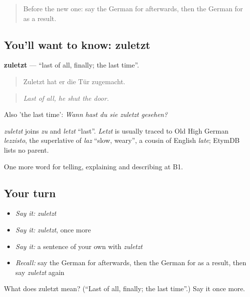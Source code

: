 \begin{quote}
Before the new one: say the German for afterwards, then the German for as a result.
\end{quote}

\subsection*{You'll want to know: zuletzt}
\textbf{zuletzt} — \textquotedblleft{}last of all, finally; the last time\textquotedblright{}.

\begin{quote}
Zuletzt hat er die Tür zugemacht.
\end{quote}

\begin{quote}
\emph{Last of all, he shut the door.}
\end{quote}

Also 'the last time': \emph{Wann hast du sie zuletzt gesehen?}

\begin{cousinweb}
\emph{zuletzt} joins \emph{zu} and \emph{letzt} \textquotedblleft{}last\textquotedblright{}. \emph{Letzt} is usually traced to Old High German \emph{lezzisto}, the superlative of \emph{laz} \textquotedblleft{}slow, weary\textquotedblright{}, a cousin of English \emph{late}; EtymDB lists no parent.
\end{cousinweb}

\begin{grammarlens}[title={What you've built}]
One more word for telling, explaining and describing at B1.
\end{grammarlens}

\subsection*{Your turn}
\begin{itemize}
\raggedright
  \item \emph{Say it:} \emph{zuletzt}
  \item \emph{Say it:} \emph{zuletzt}, once more
  \item \emph{Say it:} a sentence of your own with \emph{zuletzt}
  \item \emph{Recall:} say the German for afterwards, then the German for as a result, then say \emph{zuletzt} again
\end{itemize}

\begin{tcolorbox}[breakable,colback=teal!4,colframe=teal!35!black,title={Before you move on}]
What does zuletzt mean? (\textquotedblleft{}Last of all, finally; the last time\textquotedblright{}.) Say it once more.
\end{tcolorbox}
